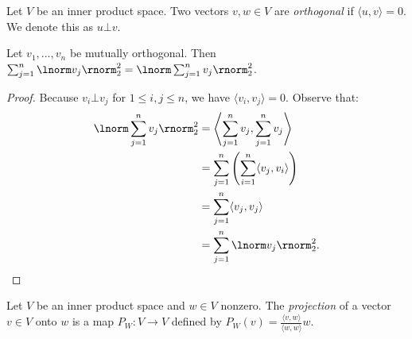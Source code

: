     \begin{definition}
        Let $V$ be an inner product space. Two vectors $v,w \in V$ are \textit{orthogonal} if $\langle u,v \rangle = 0$. We denote this as $u \bot v$.
    \end{definition}

    \begin{theorem}
        Let $v_1,...,v_n$ be mutually orthogonal. Then $\sum_{j = 1}^n \lnorm v_j \rnorm_2^2 = \lnorm \sum_{j = 1}^n v_j \rnorm_2^2$.
    \end{theorem}
        \begin{proof}
            Because $v_i \bot v_j$ for $1 \leq i,j \leq n$, we have $\langle v_i,v_j \rangle = 0$. Observe that:
                \begin{equation*}
                \begin{split}
                    \lnorm \sum_{j = 1}^n v_j \rnorm_2^2
                    & = \Biggl< \sum_{j = 1}^n v_j , \sum_{j = 1}^n v_j \Biggr> \\
                    & = \sum_{j = 1}^n \left( \sum_{i = 1}^n \langle v_j,v_i \rangle \right) \\
                    & = \sum_{j =1}^n \langle v_j,v_j \rangle \\
                    & = \sum_{j = 1}^n \lnorm v_j \rnorm_2^2.
                \end{split}
                \end{equation*}
        \end{proof}
    
    \begin{definition}
        Let $V$ be an inner product space and $w\in V$ nonzero. The \textit{projection} of a vector $v\in V$ onto $w$ is a map $P_W:V \rightarrow V$ defined by $P_W(v) = \frac{\langle v,w \rangle}{\langle w,w \rangle}w$.
        \begin{center}
        \end{center}
    \end{definition}

